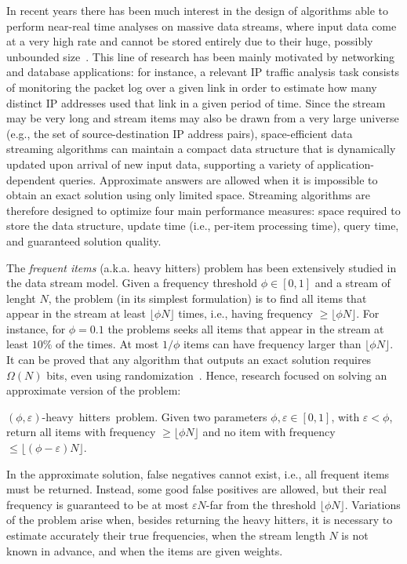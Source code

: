 \documentclass[preprint]{sigplanconf}
\begin{document}
In recent years there has been much interest in the design of algorithms able to perform near-real time analyses on massive data streams, where input data come at a very high rate and cannot be stored entirely due to their huge, possibly unbounded size~\cite{DF07, M05}. This line of research has been mainly motivated by networking and database applications: for instance, a relevant IP traffic analysis task consists of monitoring the packet log over a given link in order to estimate how many distinct IP addresses used that link in a given period of time. Since the stream may be very long and stream items may also be drawn from a very large universe (e.g., the set of source-destination IP address pairs), space-efficient data streaming algorithms can maintain a compact data structure that is dynamically updated upon arrival of new input data, supporting a variety of application-dependent queries. Approximate answers are allowed when it is impossible to obtain an exact solution using only limited space. Streaming algorithms are therefore designed to optimize four main performance measures: space required to store the data structure, update time (i.e., per-item processing time), query time, and guaranteed solution quality.

The {\em frequent items} (a.k.a. heavy hitters) problem has been extensively studied in the data stream model. Given a frequency threshold $\phi\in[0,1]$ and a stream of lenght $N$, the problem (in its simplest formulation) is to find all items that appear in the stream at least $\lfloor\phi N\rfloor$ times, i.e., having frequency $\ge\lfloor\phi N\rfloor$. For instance, for $\phi=0.1$ the problems seeks all items that appear in the stream at least $10\%$ of the times. At most $1/\phi$ items can have frequency larger than $\lfloor\phi N\rfloor$.  It can be proved that any algorithm that outputs an exact solution requires $\Omega(N)$ bits, even using randomization~\cite{M05}. Hence, research focused on solving an approximate version of the problem:

\begin{definition} 
{\mbox{$(\phi,\varepsilon)$-heavy hitters problem.}} Given two parameters $\phi,\varepsilon\in[0,1]$, with $\varepsilon<\phi$, return all items with frequency $\ge\lfloor\phi N\rfloor$ and no item with frequency $\le\lfloor(\phi-\varepsilon) N\rfloor$.
\end{definition} 

In the approximate solution, false negatives cannot exist, i.e., all frequent items must be returned. Instead, some good false positives are allowed, but their real frequency is guaranteed to be at most $\varepsilon N$-far from the threshold $\lfloor\phi N\rfloor$. Variations of the problem arise when, besides returning the heavy hitters, it is necessary to estimate accurately their true frequencies, when the stream length $N$ is not known in advance, and when the items are given weights. 
\end{document}
